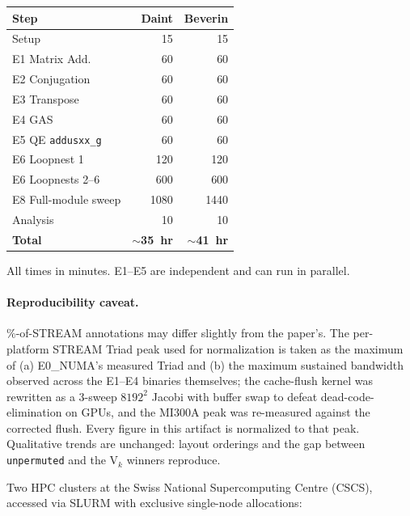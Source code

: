 \documentclass[conference]{IEEEtran}
\begin{document}
\arttime
\begin{center}
\small
\begin{tabular}{lrr}
\toprule
Step & Daint & Beverin \\
\midrule
Setup                          &  15 &  15 \\
E1 Matrix Add.                 &  60 &  60 \\
E2 Conjugation                 &  60 &  60 \\
E3 Transpose                   &  60 &  60 \\
E4 GAS                         &  60 &  60 \\
E5 QE \texttt{addusxx\_g}      &  60 &  60 \\
E6 Loopnest 1                  & 120 & 120 \\
E6 Loopnests 2--6              & 600 & 600 \\
E8 Full-module sweep           & 1080 & 1440 \\
Analysis                       &  10 &  10 \\
\midrule
\textbf{Total}                 & \textbf{$\sim$35~hr} & \textbf{$\sim$41~hr} \\
\bottomrule
\end{tabular}
\end{center}
\noindent All times in minutes. E1--E5 are independent and can run in parallel.

\paragraph{Reproducibility caveat.} \%-of-STREAM annotations may differ slightly from the paper's. The per-platform STREAM Triad peak used for normalization is taken as the maximum of (a) E0\_NUMA's measured Triad and (b) the maximum sustained bandwidth observed across the E1--E4 binaries themselves; the cache-flush kernel was rewritten as a 3-sweep $8192^{2}$ Jacobi with buffer swap to defeat dead-code-elimination on GPUs, and the MI300A peak was re-measured against the corrected flush. Every figure in this artifact is normalized to that peak. Qualitative trends are unchanged: layout orderings and the gap between \texttt{unpermuted} and the V$_k$ winners reproduce.

\artin


Two HPC clusters at the Swiss National Supercomputing Centre (CSCS), accessed via SLURM with exclusive single-node allocations:
\end{document}

